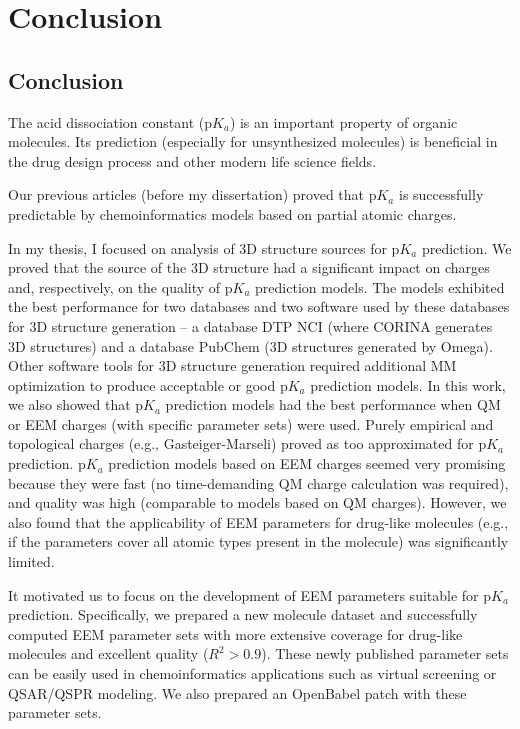 \part{Conclusion}

\chapter{Conclusion}

The acid dissociation constant (p$K_a$) is an important property of organic
mo\-le\-cules. Its prediction (especially for unsynthesized molecules) is beneficial
in the drug design process and other modern life science fields.

Our previous articles \cite{Svobodova2011, Svobodova2013} (before my
dissertation) proved that p$K_a$ is successfully predictable by
chemoinformatics models based on partial atomic charges.

In my thesis, I focused on analysis of 3D structure sources
for p$K_a$ prediction. We proved that the source of the 3D structure had
a significant impact on charges and, respectively, on the quality of p$K_a$
prediction models. The models exhibited the best performance for two databases
and two software used by these databases for 3D structure generation -- 
a database DTP NCI (where CORINA generates 3D structures) and a database
PubChem (3D structures generated by Omega). Other software tools for 3D
structure generation required additional MM optimization to produce acceptable
or good p$K_a$ prediction models. In this work, we also showed that p$K_a$
prediction models had the best performance when QM or EEM charges (with specific
parameter sets) were used. Purely empirical and topological charges (e.g.,
Gasteiger-Marseli) proved as too approximated for p$K_a$ prediction. p$K_a$
prediction models based on EEM charges seemed very promising because they were
fast (no time-demanding QM charge calculation was required), and quality was
high (comparable to models based on QM charges). However, we also found that
the applicability of EEM parameters for drug-like molecules (e.g., if the
parameters cover all atomic types present in the molecule) was significantly
limited. 

It motivated us to focus on the development of EEM parameters suitable 
for p$K_a$ prediction. Specifically, we prepared a new molecule dataset and
successfully computed EEM parameter sets with more extensive coverage
for drug-like molecules and excellent quality ($R^2 > 0.9$). These newly published
parameter sets can be easily used in chemoinformatics applications
such as virtual screening or QSAR/QSPR modeling. We also prepared an OpenBabel
patch with these parameter sets.

